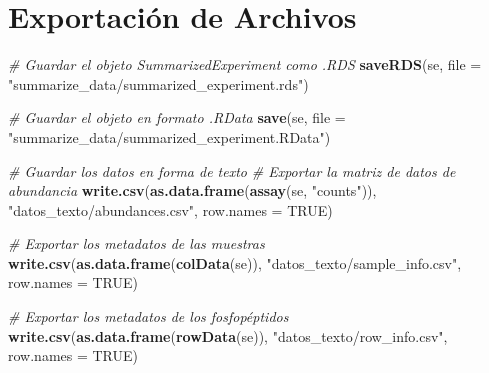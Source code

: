 \documentclass[
]{article}
\newenvironment{Shaded}{\begin{snugshade}}{\end{snugshade}}
\newcommand{\AttributeTok}[1]{\textcolor[rgb]{0.13,0.29,0.53}{#1}}
\newcommand{\CommentTok}[1]{\textcolor[rgb]{0.56,0.35,0.01}{\textit{#1}}}
\newcommand{\ConstantTok}[1]{\textcolor[rgb]{0.56,0.35,0.01}{#1}}
\newcommand{\FunctionTok}[1]{\textcolor[rgb]{0.13,0.29,0.53}{\textbf{#1}}}
\newcommand{\NormalTok}[1]{#1}
\newcommand{\StringTok}[1]{\textcolor[rgb]{0.31,0.60,0.02}{#1}}
\begin{document}
\section{Exportación de Archivos}\label{exportaciuxf3n-de-archivos}

\begin{Shaded}
\begin{Highlighting}[]
\CommentTok{\# Guardar el objeto SummarizedExperiment como .RDS}
\FunctionTok{saveRDS}\NormalTok{(se, }\AttributeTok{file =} \StringTok{"summarize\_data/summarized\_experiment.rds"}\NormalTok{)}

\CommentTok{\# Guardar el objeto en formato .RData}
\FunctionTok{save}\NormalTok{(se, }\AttributeTok{file =} \StringTok{"summarize\_data/summarized\_experiment.RData"}\NormalTok{)}
\end{Highlighting}
\end{Shaded}

\begin{Shaded}
\begin{Highlighting}[]
\CommentTok{\# Guardar los datos en forma de texto}
\CommentTok{\# Exportar la matriz de datos de abundancia}
\FunctionTok{write.csv}\NormalTok{(}\FunctionTok{as.data.frame}\NormalTok{(}\FunctionTok{assay}\NormalTok{(se, }\StringTok{"counts"}\NormalTok{)), }\StringTok{"datos\_texto/abundances.csv"}\NormalTok{, }\AttributeTok{row.names =} \ConstantTok{TRUE}\NormalTok{)}

\CommentTok{\# Exportar los metadatos de las muestras}
\FunctionTok{write.csv}\NormalTok{(}\FunctionTok{as.data.frame}\NormalTok{(}\FunctionTok{colData}\NormalTok{(se)), }\StringTok{"datos\_texto/sample\_info.csv"}\NormalTok{, }\AttributeTok{row.names =} \ConstantTok{TRUE}\NormalTok{)}

\CommentTok{\# Exportar los metadatos de los fosfopéptidos}
\FunctionTok{write.csv}\NormalTok{(}\FunctionTok{as.data.frame}\NormalTok{(}\FunctionTok{rowData}\NormalTok{(se)), }\StringTok{"datos\_texto/row\_info.csv"}\NormalTok{, }\AttributeTok{row.names =} \ConstantTok{TRUE}\NormalTok{)}
\end{Highlighting}
\end{Shaded}
\end{document}
